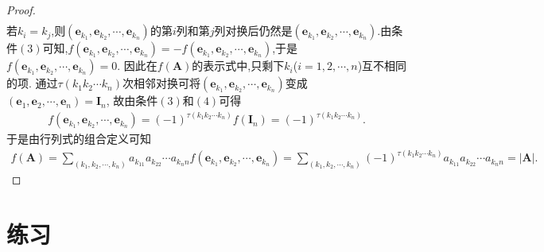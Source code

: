 \documentclass[lang=cn,newtx,10pt,scheme=chinese]{elegantbook}
\begin{document}
\begin{proof}
\begin{align*}
\end{align*}
若\(k_i = k_j\),则\((\boldsymbol{e}_{k_1},\boldsymbol{e}_{k_2},\cdots,\boldsymbol{e}_{k_n})\)的第\(i\)列和第\(j\)列对换后仍然是\((\boldsymbol{e}_{k_1},\boldsymbol{e}_{k_2},\cdots,\boldsymbol{e}_{k_n})\).由条件\((3)\)可知,\(f(\boldsymbol{e}_{k_1},\boldsymbol{e}_{k_2},\cdots,\boldsymbol{e}_{k_n}) = -f(\boldsymbol{e}_{k_1},\boldsymbol{e}_{k_2},\cdots,\boldsymbol{e}_{k_n})\),于是\(f(\boldsymbol{e}_{k_1},\boldsymbol{e}_{k_2},\cdots,\boldsymbol{e}_{k_n}) = 0\).
因此在\(f(\boldsymbol{A})\)的表示式中,只剩下\(k_i\)(\(i = 1,2,\cdots,n\))互不相同的项.
通过\(\tau(k_1k_2\cdots k_n)\)次相邻对换可将\((\boldsymbol{e}_{k_1},\boldsymbol{e}_{k_2},\cdots,\boldsymbol{e}_{k_n})\)变成\((\boldsymbol{e}_1,\boldsymbol{e}_2,\cdots,\boldsymbol{e}_n) = \boldsymbol{I}_n\),
故由条件\((3)\)和\((4)\)可得
\begin{align*}
f(\boldsymbol{e}_{k_1},\boldsymbol{e}_{k_2},\cdots,\boldsymbol{e}_{k_n}) = (-1)^{\tau(k_1k_2\cdots k_n)}f(\boldsymbol{I}_n) = (-1)^{\tau(k_1k_2\cdots k_n)}.
\end{align*}
于是由行列式的组合定义可知
\begin{align*}
f(\boldsymbol{A}) = \sum_{(k_1,k_2,\cdots,k_n)}a_{k_11}a_{k_22}\cdots a_{k_nn}f(\boldsymbol{e}_{k_1},\boldsymbol{e}_{k_2},\cdots,\boldsymbol{e}_{k_n}) = \sum_{(k_1,k_2,\cdots,k_n)}(-1)^{\tau(k_1k_2\cdots k_n)}a_{k_11}a_{k_22}\cdots a_{k_nn} = |\boldsymbol{A}|.
\end{align*}
\end{proof}

\section{练习}
\end{document}
